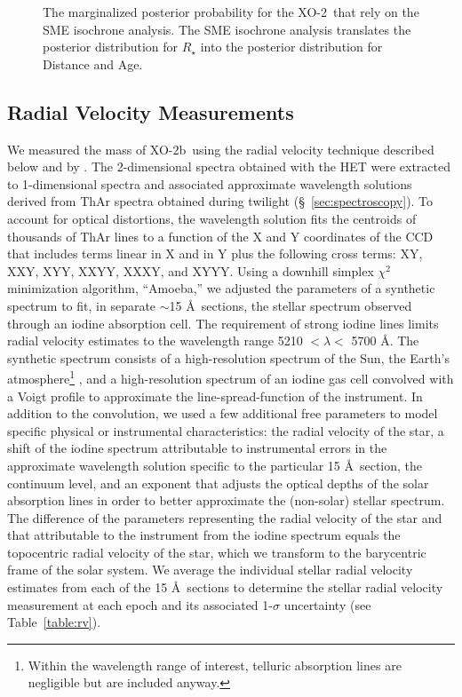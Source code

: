 \documentclass{emulateapj}
\newcommand{\xonb}{XO-2b}
\newcommand{\xon}{XO-2}
\begin{document}
\begin{figure}
\caption{The marginalized posterior probability for the \xon\ that rely on the SME isochrone analysis. The SME isochrone analysis translates the posterior distribution for $R_{\star}$ into the posterior distribution for Distance and Age.\label{othpost}}
\end{figure}


\subsection{Radial Velocity Measurements}\label{sec:rv}

We measured the mass of \xonb\ using the radial velocity
technique described below and by \citet{MCC06}.
The 2-dimensional spectra obtained with
the HET were extracted to 1-dimensional spectra and associated
approximate wavelength solutions derived from ThAr spectra obtained
during twilight (\S~\ref{sec:spectroscopy}).
To account for optical distortions, the wavelength solution fits the
centroids of thousands of ThAr lines to a function of
the X and Y coordinates of the CCD that includes terms linear in X and
in Y plus the following
cross terms: XY, XXY, XYY, XXYY, XXXY, and XYYY.
Using a downhill simplex $\chi^2$ minimization algorithm, ``Amoeba,'' we
adjusted
the parameters of a synthetic spectrum to fit, in separate
$\sim$15 \AA\ sections, the stellar spectrum observed through an iodine absorption
cell. The requirement of strong iodine lines
limits radial velocity estimates to the wavelength range 5210 $< \lambda
<$ 5700 \AA.
The synthetic spectrum consists of a high-resolution spectrum of the
Sun, the Earth's atmosphere\footnote{Within the
wavelength range of interest, telluric absorption lines are negligible
but are included anyway.}
\citep{WAL98}, and a high-resolution spectrum of an iodine gas
cell \citep{COC00} convolved with
a Voigt profile to approximate the line-spread-function of the
instrument. In addition to the convolution,
we used a few additional free parameters to model specific physical or
instrumental characteristics:
the radial velocity of the star, a shift of the iodine spectrum
attributable to instrumental errors
in the approximate wavelength solution specific to the particular 15 \AA\
section, the continuum
level, and an exponent that adjusts the optical depths of the solar
absorption lines in order to better approximate the
(non-solar) stellar spectrum.
The difference of the parameters representing the radial velocity of the
star and
that attributable to the instrument from the iodine spectrum equals the
topocentric radial velocity of the star, which
we transform to the barycentric frame of the solar system.
We average the individual stellar radial velocity estimates from each of
the 15 \AA\ sections to determine
the stellar radial velocity measurement at each epoch and its associated
1-$\sigma$ uncertainty (see Table~\ref{table:rv}).
\end{document}
